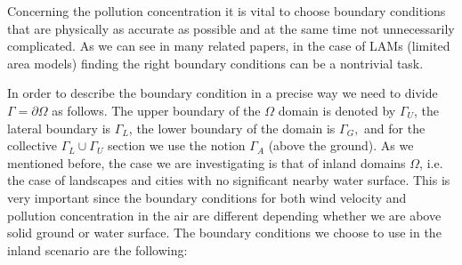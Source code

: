 \documentclass[11pt]{article}
\begin{document}
Concerning the pollution concentration it is vital to choose boundary conditions that are physically as accurate as possible and at the same time not unnecessarily complicated. As we can see in many related papers, in the case of LAMs (limited area models) finding the right boundary conditions can be a nontrivial task.

In order to describe the boundary condition in a precise way we need to divide $\Gamma = \partial \Omega$ as follows. The upper boundary of the $\Omega$ domain is denoted by $\Gamma_U$, the lateral boundary is $\Gamma_L$, the lower boundary of the domain is $\Gamma_G,$ and for the collective $\Gamma_L \cup \Gamma_U$ section we use the notion $\Gamma_A$ (above the ground).
As we mentioned before, the case we are investigating is that of inland domains $\Omega$, i.e. the case of landscapes and cities with no significant nearby water surface.  This is very important since the boundary conditions for both wind velocity and pollution concentration in the air are different depending whether we are above solid ground or water surface. The boundary conditions we choose to use in the inland scenario are the following:

\begin{figure}[!h]
  \centering
\end{figure}
\end{document}
